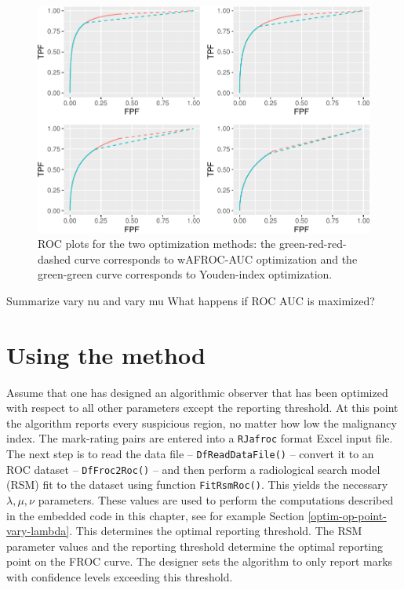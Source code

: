 \documentclass[
]{book}
\begin{document}
\begin{figure}
\centering
\includegraphics{21-optim-op-point_files/figure-latex/optim-op-point-vary-lambda-roc-1.pdf}
\caption{\label{fig:optim-op-point-vary-lambda-roc}ROC plots for the two optimization methods: the green-red-red-dashed curve corresponds to wAFROC-AUC optimization and the green-green curve corresponds to Youden-index optimization.}
\end{figure}

Summarize vary nu and vary mu
What happens if ROC AUC is maximized?

\hypertarget{optim-op-point-how-to-use-method}{%
\section{Using the method}\label{optim-op-point-how-to-use-method}}

Assume that one has designed an algorithmic observer that has been optimized with respect to all other parameters except the reporting threshold. At this point the algorithm reports every suspicious region, no matter how low the malignancy index. The mark-rating pairs are entered into a \texttt{RJafroc} format Excel input file. The next step is to read the data file -- \texttt{DfReadDataFile()} -- convert it to an ROC dataset -- \texttt{DfFroc2Roc()} -- and then perform a radiological search model (RSM) fit to the dataset using function \texttt{FitRsmRoc()}. This yields the necessary \(\lambda, \mu, \nu\) parameters. These values are used to perform the computations described in the embedded code in this chapter, see for example Section \ref{optim-op-point-vary-lambda}. This determines the optimal reporting threshold. The RSM parameter values and the reporting threshold determine the optimal reporting point on the FROC curve. The designer sets the algorithm to only report marks with confidence levels exceeding this threshold.
\end{document}
